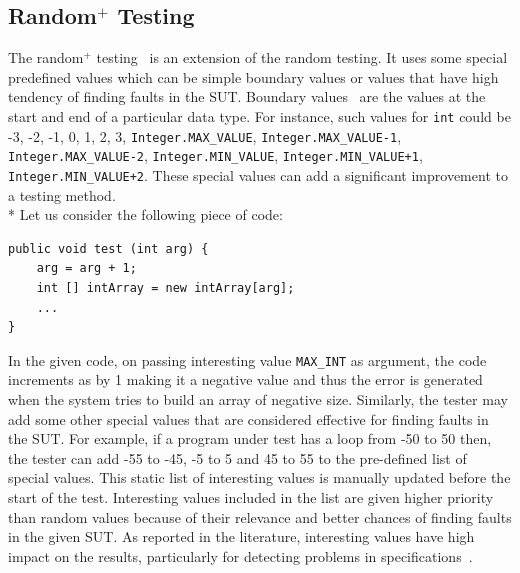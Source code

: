 \subsection{Random$^+$ Testing} \label{subsec:randomPlusTesting}
The random$^+$ testing~\cite{ciupa2007experimental, ciupa2008finding} is an extension of the random testing. It uses some special predefined values which can be simple boundary values or values that have high tendency of finding faults in the SUT. Boundary values~\cite{beizer2003software} are the values at the start and end of a particular data type. For instance, such values for \verb+int+ could be -3, -2, -1, 0, 1, 2, 3, \verb+Integer.MAX_VALUE+, \verb+Integer.MAX_VALUE-1+, \verb+Integer.MAX_VALUE-2+, \verb+Integer.MIN_VALUE+, \verb-Integer.MIN_VALUE+1-, \verb-Integer.MIN_VALUE+2-. These special values can add a significant improvement to a testing method. \\*
Let us consider the following piece of code:
\bigskip
\bigskip
\begin{lstlisting}
public void test (int arg) {
	arg = arg + 1;
	int [] intArray = new intArray[arg];
	...
}
\end{lstlisting}
\bigskip

In the given code, on passing interesting value \verb+MAX_INT+ as argument, the code increments as by 1 making it a negative value and thus the error is generated when the system tries to build an array of negative size. Similarly, the tester may add some other special values that are considered effective for finding faults in the SUT. For example, if a program under test has a loop from -50 to 50 then, the tester can add -55 to -45, -5 to 5 and 45 to 55 to the pre-defined list of special values. This static list of interesting values is manually updated before the start of the test. Interesting values included in the list are given higher priority than random values because of their relevance and better chances of finding faults in the given SUT. As reported in the literature, interesting values have high impact on the results, particularly for detecting problems in specifications~\cite{ciupa2008finding}.


